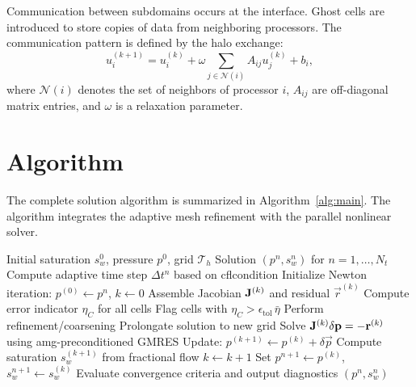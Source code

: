 Communication between subdomains occurs at the interface. Ghost cells are introduced to store copies of data from neighboring processors. The communication pattern is defined by the halo exchange:
\begin{equation}
    u_i^{(k+1)} = u_i^{(k)} + \omega \sum_{j \in \mathcal{N}(i)} A_{ij} u_j^{(k)} + b_i,
    \label{eq:halo}
\end{equation}
where $\mathcal{N}(i)$ denotes the set of neighbors of processor $i$, $A_{ij}$ are off-diagonal matrix entries, and $\omega$ is a relaxation parameter.

\section{Algorithm}
\label{sec:methodology:algorithm}

The complete solution algorithm is summarized in Algorithm~\ref{alg:main}. The algorithm integrates the adaptive mesh refinement with the parallel nonlinear solver.

\begin{algorithm}[htbp]
\caption{Adaptive Multiscale Reservoir Simulation}
\label{alg:main}
\begin{algorithmic}[1]
\Require Initial saturation $s_w^0$, pressure $p^0$, grid $\mathcal{T}_h$
\Ensure Solution $(p^n, s_w^n)$ for $n = 1, \ldots, N_t$
    \State Compute adaptive time step $\Delta t^n$ based on \gls{cflcondition}
    \State Initialize Newton iteration: $p^{(0)} \gets p^n$, $k \gets 0$
        \State Assemble Jacobian $\mathbf{J}^{(k)}$ and residual $\vec{r}^{(k)}$
            \State Compute error indicator $\eta_C$ for all cells
            \State Flag cells with $\eta_C > \epsilon_{\text{tol}} \, \bar{\eta}$
            \State Perform refinement/coarsening
            \State Prolongate solution to new grid
        \EndIf
        \State Solve $\mathbf{J}^{(k)} \delta \mathbf{p} = -\mathbf{r}^{(k)}$ using \gls{amg}-preconditioned GMRES
        \State Update: $p^{(k+1)} \gets p^{(k)} + \delta \vec{p}$
        \State Compute saturation $s_w^{(k+1)}$ from fractional flow
        \State $k \gets k + 1$
    \EndWhile
    \State Set $p^{n+1} \gets p^{(k)}$, $s_w^{n+1} \gets s_w^{(k)}$
    \State Evaluate convergence criteria and output diagnostics
\EndFor
\State \Return $(p^n, s_w^n)$
\end{algorithmic}
\end{algorithm}

